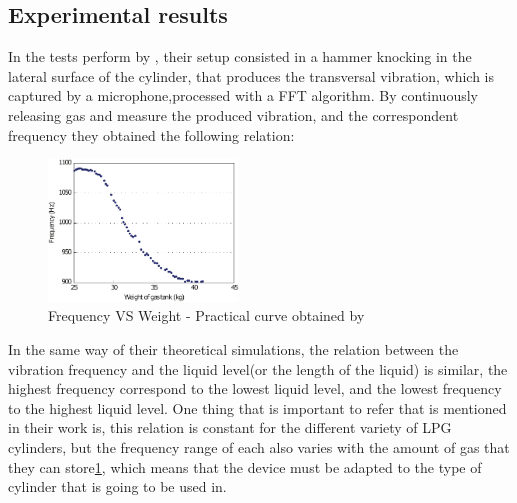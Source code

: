 \subsection{Experimental results}\label{subsec:SOAExpRes}
In the tests perform by \citeauthor{wuLiquidLevelDetector2014b}\cite{wuLiquidLevelDetector2014b}, their setup consisted in a hammer knocking in the lateral surface of the cylinder, that produces the transversal vibration, which is captured by a microphone,processed with a FFT algorithm. By continuously releasing gas and measure the produced vibration, and the correspondent frequency they obtained the following relation: 
\begin{figure}[!htb]
    \centering
    \includegraphics[width=0.45\textwidth]{Chapters/2CHP/Diagrams/weightvsfrequency.pdf}
    \caption{Frequency VS Weight - Practical curve obtained by \citeauthor{wuLiquidLevelDetector2014b}}
    \label{fig:practCurve}
\end{figure}
In the same way of their theoretical simulations, the relation between the vibration frequency and the liquid level(or the length of the liquid) is similar, the highest frequency correspond to the lowest liquid level, and the lowest frequency to the highest liquid level. One thing that is important to refer that is mentioned in their work is, this relation is constant for the different variety of LPG cylinders, but the frequency range of each also varies with the amount of gas that they can store\ref{fig:practCurve}, which means that the device must be adapted to the type of cylinder that is going to be used in. 
